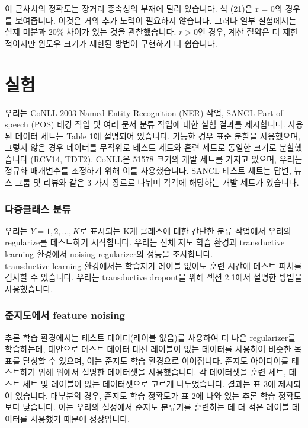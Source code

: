 \documentclass{article}
\begin{document}
이 근사치의 정확도는 장거리 종속성의 부재에 달려 있습니다. 식 (21)은 r = 0의 경우를 보여줍니다. 이것은 거의 추가 노력이 필요하지 않습니다. 그러나 일부 실험에서는 실제 미분과 20\% 차이가 있는 것을 관찰했습니다. $r > 0$인 경우, 계산 절약은 더 제한적이지만 윈도우 크기가 제한된 방법이 구현하기 더 쉽습니다.

\section{실험}
우리는 CoNLL-2003 Named Entity Recognition (NER) 작업, SANCL Part-of-speech (POS) 태깅 작업 및 여러 문서 분류 작업에 대한 실험 결과를 제시합니다. 사용된 데이터 세트는 Table 1에 설명되어 있습니다. 가능한 경우 표준 분할을 사용했으며, 그렇지 않은 경우 데이터를 무작위로 테스트 세트와 훈련 세트로 동일한 크기로 분할했습니다 (RCV14, TDT2). CoNLL은 51578 크기의 개발 세트를 가지고 있으며, 우리는 정규화 매개변수를 조정하기 위해 이를 사용했습니다. SANCL 테스트 세트는 답변, 뉴스 그룹 및 리뷰와 같은 3 가지 장르로 나뉘며 각각에 해당하는 개발 세트가 있습니다.

\subsubsection{다중클래스 분류}
우리는 $Y = {1, 2, . . . , K}$로 표시되는 K개 클래스에 대한 간단한 분류 작업에서 우리의 regularize를 테스트하기 시작합니다. 우리는 전체 지도 학습 환경과 transductive learning 환경에서 noising regularizer의 성능을 조사합니다.\\

transductive learning 환경에서는 학습자가 레이블 없이도 훈련 시간에 테스트 피처를 검사할 수 있습니다. 우리는 transductive dropout을 위해 섹션 2.1에서 설명한 방법을 사용했습니다.

\subsubsection{준지도에서 feature noising}
추론 학습 환경에서는 테스트 데이터(레이블 없음)를 사용하여 더 나은 regularizer를 학습하는데, 대안으로 테스트 데이터 대신 레이블이 없는 데이터를 사용하여 비슷한 목표를 달성할 수 있으며, 이는 준지도 학습 환경으로 이어집니다. 준지도 아이디어를 테스트하기 위해 위에서 설명한 데이터셋을 사용했습니다. 각 데이터셋을 훈련 세트, 테스트 세트 및 레이블이 없는 데이터셋으로 고르게 나누었습니다. 결과는 표 3에 제시되어 있습니다. 대부분의 경우, 준지도 학습 정확도가 표 2에 나와 있는 추론 학습 정확도보다 낮습니다. 이는 우리의 설정에서 준지도 분류기를 훈련하는 데 더 적은 레이블 데이터를 사용했기 때문에 정상입니다.
\end{document}
